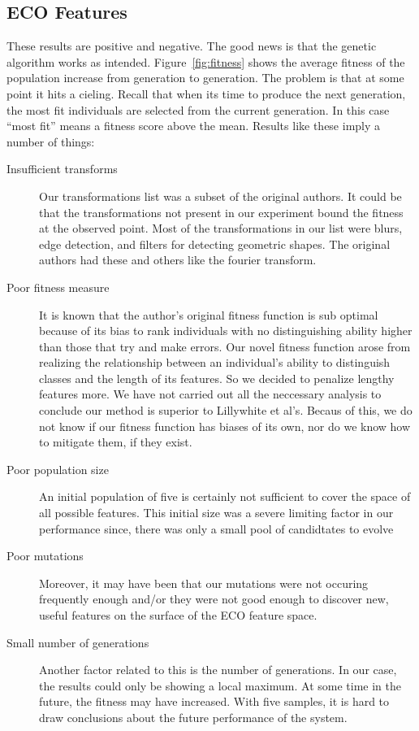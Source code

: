 \documentclass[conference]{IEEEtran}
\begin{document}
\subsection{ECO Features}
These results are positive and negative. The good news is that the genetic algorithm works as intended. Figure~\ref{fig:fitness} shows the average fitness of the population increase from generation to generation. The problem is that at some point it hits a cieling. Recall that when its time to produce the next generation, the most fit individuals are selected from the current generation. In this case ``most fit'' means a fitness score above the mean. Results like these imply a number of things:
\begin{description}
\item[Insufficient transforms]
  Our transformations list was a subset of the original authors. It could be that the transformations not present in our experiment bound the fitness at the observed point. Most of the transformations in our list were blurs, edge detection, and filters for detecting geometric shapes. The original authors had these and others like the fourier transform.
\item[Poor fitness measure]
  It is known that the author's original fitness function is sub optimal because of its bias to rank individuals with no distinguishing ability higher than those that try and make errors. Our novel fitness function arose from realizing the relationship between an individual's ability to distinguish classes and the length of its features. So we decided to penalize lengthy features more. We have not carried out all the neccessary analysis to conclude our method is superior to Lillywhite et al's. Becaus of this, we do not know if our fitness function has biases of its own, nor do we know how to mitigate them, if they exist. 
\item[Poor population size]
  An initial population of five is certainly not sufficient to cover the space of all possible features. This initial size was a severe limiting factor in our performance since, there was only a small pool of candidtates to evolve
\item[Poor mutations]
  Moreover, it may have been that our mutations were not occuring frequently enough and/or they were not good enough to discover new, useful features on the surface of the ECO feature space.
\item[Small number of generations]
  Another factor related to this is the number of generations. In our case, the results could only be showing a local maximum. At some time in the future, the fitness may have increased. With five samples, it is hard to draw conclusions about the future performance of the system.
\end{description}
\end{document}
